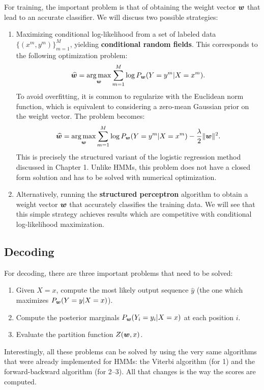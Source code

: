 For training, 
the important problem is that of obtaining the weight vector $\boldsymbol{w}$ that lead to an accurate 
classifier. 
We will discuss two possible strategies:
\begin{enumerate}
\item Maximizing conditional log-likelihood from a set of labeled data $\{(x^m,y^m)\}_{m=1}^M$, yielding \textbf{conditional random fields}. This corresponds to the following optimization problem:
\begin{equation}
\widehat{\boldsymbol{w}} = \operatorname*{arg\,max}_{\boldsymbol{w}} \sum_{m=1}^M \log P_{\boldsymbol{w}}(Y=y^m | X=x^m).
\end{equation}
To avoid overfitting, it is common to regularize with the Euclidean norm function, 
which is equivalent to considering a zero-mean Gaussian prior on the weight vector.
The problem becomes:
\begin{equation}
\widehat{\boldsymbol{w}} = \operatorname*{arg\,max}_{\boldsymbol{w}} \sum_{m=1}^M \log P_{\boldsymbol{w}}(Y=y^m | X=x^m) - \frac{\lambda}{2} \|\boldsymbol{w}\|^2.
\end{equation}
This is precisely the structured variant of the logistic regression 
method discussed in Chapter 1.
Unlike HMMs, this problem does not have a closed form solution 
and has to be solved with numerical optimization. 
\item Alternatively, running the \textbf{structured perceptron} algorithm 
to obtain a weight vector $\boldsymbol{w}$ that accurately
classifies the training data. 
We will see that this simple strategy achieves results which are competitive 
with conditional log-likelihood maximization.
\end{enumerate}

\subsection{Decoding}

For decoding,  
there are three important problems that need to be solved: 
\begin{enumerate}
\item Given $X=x$, compute the most likely output sequence $\widehat{y}$ (the one which maximizes $P_{\boldsymbol{w}}(Y=y|X=x)$). 
\item Compute the posterior marginals $P_{\boldsymbol{w}}(Y_i=y_i|X=x)$ at each position $i$.
\item Evaluate the partition function $Z(\boldsymbol{w},x)$. 
\end{enumerate}
Interestingly, all these problems can be solved by using the very same
algorithms that were 
already implemented for HMMs: the Viterbi algorithm (for 1) and the forward-backward algorithm (for 2--3). All that changes is the way the scores are computed. 

